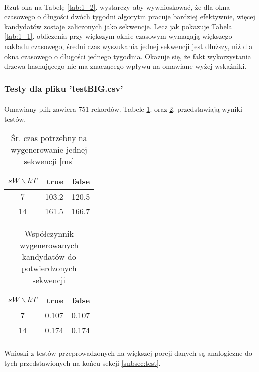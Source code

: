 \documentclass[11pt,a4paper]{article}
\begin{document}
\paragraph{}Rzut oka na Tabelę \ref{tab:1_2}. wystarczy aby wywnioskować, że dla okna czasowego o długości dwóch tygodni algorytm pracuje bardziej efektywnie, więcej kandydatów zostaje zaliczonych jako sekwencje. Lecz jak pokazuje Tabela \ref{tab:1_1}. obliczenia przy większym oknie czasowym wymagają większego nakładu czasowego, średni czas wyszukania jednej sekwencji jest dłuższy, niż dla okna czasowego o długości jednego tygodnia. Okazuje się, że fakt wykorzystania drzewa hashującego nie ma znaczącego wpływu na omawiane wyżej wskaźniki.

\subsubsection{Testy dla pliku 'testBIG.csv'}
\paragraph{} Omawiany plik zawiera 751 rekordów. Tabele \ref{tab:2_1}. oraz \ref{tab:2_2}. przedstawiają wyniki testów.

\begin{table}[!hbt]
\caption{Śr. czas potrzebny na wygenerowanie jednej sekwencji [ms]}
\centering
\begin{tabular}{|c|r|r|}
\hline
$sW\backslash hT$	& true	& false	\\[1.2ex]\hline
7					& 103.2	& 120.5	\\[1ex]\hline
14					& 161.5	& 166.7	\\[1ex]\hline
\end{tabular}
\label{tab:2_1}
\end{table}

\begin{table}[!hbt]
\caption{Współczynnik wygenerowanych kandydatów do potwierdzonych sekwencji}
\centering
\begin{tabular}{|c|r|r|}
\hline
$sW\backslash hT$	& true	& false	\\[1.2ex]\hline
7					& 0.107	& 0.107	\\[1ex]\hline
14					& 0.174	& 0.174	\\[1ex]\hline
\end{tabular}
\label{tab:2_2}
\end{table}

\paragraph{}Wnioski z testów przeprowadzonych na większej porcji danych są analogiczne do tych przedstawionych na końcu sekcji \ref{subsec:test}.
\end{document}
